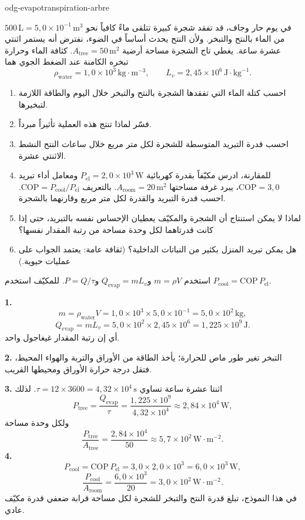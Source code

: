 \begin{exo}{odg-evapotranspiration-arbre}

في يوم حار وجاف، قد تفقد شجرة كبيرة تتلقى ماءً كافياً نحو $500\,\text{L}=5{,}0\times10^{-1}\,\text{m}^3$ من الماء بالنتح والتبخر. ولأن النتح يحدث أساساً في الضوء، نفترض أنه يستمر اثنتي عشرة ساعة. يغطي تاج الشجرة مساحة أرضية $A_{\text{tree}}=50\,\text{m}^2$. كثافة الماء وحرارة تبخره الكامنة عند الضغط الجوي هما
\[
\rho_{\text{water}}=1{,}0\times10^3\,\text{kg}\!\cdot\!\text{m}^{-3},
\qquad L_v=2{,}45\times10^6\,\text{J}\!\cdot\!\text{kg}^{-1}.
\]
\begin{enumerate}
  \item احسب كتلة الماء التي تفقدها الشجرة بالنتح والتبخر خلال اليوم والطاقة اللازمة لتبخيرها.
  \item فسّر لماذا تنتج هذه العملية تأثيراً مبرداً.
  \item احسب قدرة التبريد المتوسطة للشجرة لكل متر مربع خلال ساعات النتح النشط الاثنتي عشرة.
  \item للمقارنة، ادرس مكيّفاً بقدرة كهربائية $P_{\mathrm{el}}=2{,}0\times10^3\,\text{W}$ ومعامل أداء تبريد $\mathrm{COP}=3{,}0$، يبرد غرفة مساحتها $A_{\text{room}}=20\,\text{m}^2$. بالتعريف $\mathrm{COP}=P_{\text{cool}}/P_{\mathrm{el}}$. احسب قدرة التبريد والقدرة لكل متر مربع وقارنهما بالشجرة.
  \item لماذا لا يمكن استنتاج أن الشجرة والمكيّف يعطيان الإحساس نفسه بالتبريد، حتى إذا كانت قدرتاهما لكل وحدة مساحة من رتبة المقدار نفسها؟
  \item هل يمكن تبريد المنزل بكثير من النباتات الداخلية؟ (ثقافة عامة: يعتمد الجواب على عمليات حيوية.)
\end{enumerate}
\begin{indication}
استخدم $m=\rho V$ و$Q_{\mathrm{evap}}=mL_v$ و$P=Q/\tau$. للمكيّف استخدم $P_{\text{cool}}=\mathrm{COP}\,P_{\mathrm{el}}$.
\end{indication}
\begin{solution}
\textbf{1.}
\[
m=\rho_{\text{water}}V=1{,}0\times10^3\times5{,}0\times10^{-1}
=5{,}0\times10^2\,\text{kg},
\]
\[
Q_{\mathrm{evap}}=mL_v=5{,}0\times10^2\times2{,}45\times10^6
=1{,}225\times10^9\,\text{J}.
\]
أي إن رتبة المقدار غيغاجول واحد.

\textbf{2.} التبخر تغير طور ماص للحرارة؛ يأخذ الطاقة من الأوراق والتربة والهواء المحيط، فتقل درجة حرارة الأوراق ومحيطها القريب.

\textbf{3.} اثنتا عشرة ساعة تساوي $\tau=12\times3600=4{,}32\times10^4\,\text{s}$. لذلك
\[
P_{\text{tree}}=\frac{Q_{\mathrm{evap}}}{\tau}
=\frac{1{,}225\times10^9}{4{,}32\times10^4}\approx2{,}84\times10^4\,\text{W},
\]
ولكل وحدة مساحة
\[
\frac{P_{\text{tree}}}{A_{\text{tree}}}
=\frac{2{,}84\times10^4}{50}\approx5{,}7\times10^2\,\text{W}\!\cdot\!\text{m}^{-2}.
\]
\textbf{4.}
\[
P_{\text{cool}}=\mathrm{COP}\,P_{\mathrm{el}}
=3{,}0\times2{,}0\times10^3=6{,}0\times10^3\,\text{W},
\]
\[
\frac{P_{\text{cool}}}{A_{\text{room}}}
=\frac{6{,}0\times10^3}{20}=3{,}0\times10^2\,\text{W}\!\cdot\!\text{m}^{-2}.
\]
في هذا النموذج، تبلغ قدرة النتح والتبخر للشجرة لكل مساحة قرابة ضعفي قدرة مكيّف عادي.


\end{solution}
\end{exo}
